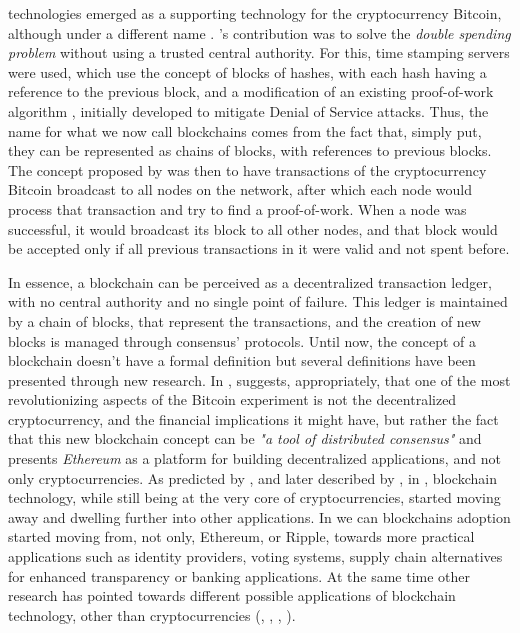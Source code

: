  technologies emerged as a supporting technology for the cryptocurrency Bitcoin, although under a different name \cite{nakamoto_bitcoin:_2008}. \citeauthor{nakamoto_bitcoin:_2008}'s contribution was to solve the \textit{double spending problem} without using a trusted central authority. For this, time stamping servers were used, which use the concept of blocks of hashes, with each hash having a reference to the previous block, and a modification of an existing proof-of-work algorithm \cite{back_hashcash_2002}, initially developed to mitigate Denial of Service attacks. Thus, the name for what we now call blockchains comes from the fact that, simply put, they can be represented as chains of blocks, with references to previous blocks. The concept proposed by \citeauthor{nakamoto_bitcoin:_2008} was then to have transactions of the cryptocurrency Bitcoin broadcast to all nodes on the network, after which each node would process that transaction and try to find a proof-of-work. When a node was successful, it would broadcast its block to all other nodes, and that block would be accepted only if all previous transactions in it were valid and not spent before.

In essence, a blockchain can be perceived as a decentralized transaction ledger, with no central authority and no single point of failure. This ledger is maintained by a chain of blocks, that represent the transactions, and the creation of new blocks is managed through consensus' protocols. Until now, the concept of a blockchain doesn't have a formal definition but several definitions have been presented through new research. In \cite{buterin_next-generation_2013}, \citeauthor{buterin_next-generation_2013} suggests, appropriately, that one of the most revolutionizing aspects of the Bitcoin experiment is not the decentralized cryptocurrency, and the financial implications it might have, but rather the fact that this new blockchain concept can be \textit{"a tool of distributed consensus"} and presents \textit{Ethereum} as a platform for building decentralized applications, and not only cryptocurrencies. As predicted by \citeauthor{buterin_next-generation_2013}, and later described by \citeauthor{pilkington_blockchain_2016}, in \cite{pilkington_blockchain_2016}, blockchain technology, while still being at the very core of cryptocurrencies, started moving away and dwelling further into other applications. In \cite{pilkington_blockchain_2016} we can blockchains adoption started moving from, not only, Ethereum, or Ripple, towards more practical applications such as identity providers, voting systems, supply chain alternatives for enhanced transparency or banking applications. At the same time other research has pointed towards different possible applications of blockchain technology, other than cryptocurrencies (\cite{crosby_blockchain_2016}, \cite{underwood_blockchain_2016}, \cite{yermack_corporate_2017}, \cite{xu_blockchain_2016}).

